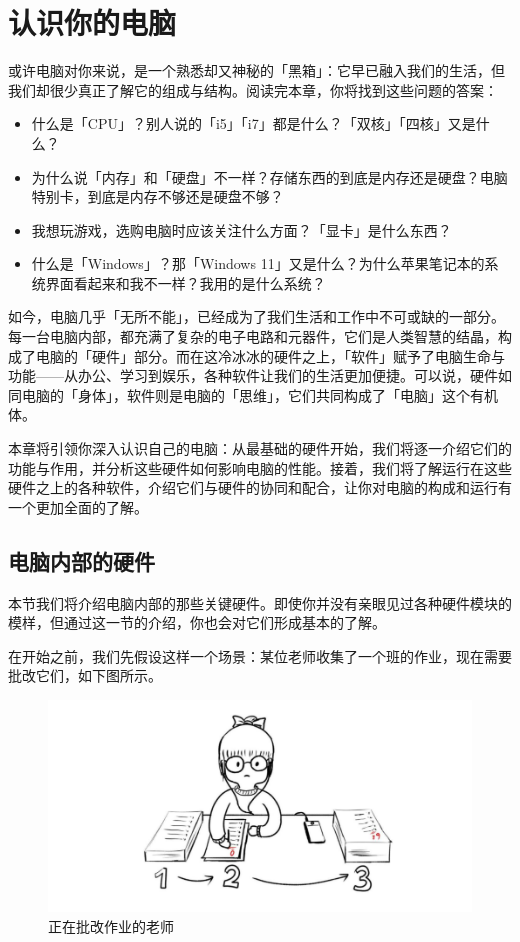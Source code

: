 \chapter{认识你的电脑}
\label{cha:computer-and-its-components}

\begin{intro}
  或许电脑对你来说，是一个熟悉却又神秘的「黑箱」：它早已融入我们的生活，但我们却很少真正了解它的组成与结构。阅读完本章，你将找到这些问题的答案：

  \begin{itemize}
    \item 什么是「CPU」？别人说的「i5」「i7」都是什么？「双核」「四核」又是什么？
    \item 为什么说「内存」和「硬盘」不一样？存储东西的到底是内存还是硬盘？电脑特别卡，到底是内存不够还是硬盘不够？
    \item 我想玩游戏，选购电脑时应该关注什么方面？「显卡」是什么东西？
    \item 什么是「Windows」？那「Windows 11」又是什么？为什么苹果笔记本的系统界面看起来和我不一样？我用的是什么系统？
  \end{itemize}
\end{intro}

如今，电脑几乎「无所不能」，已经成为了我们生活和工作中不可或缺的一部分。每一台电脑内部，都充满了复杂的电子电路和元器件，它们是人类智慧的结晶，构成了电脑的「硬件」部分。而在这冷冰冰的硬件之上，「软件」赋予了电脑生命与功能——从办公、学习到娱乐，各种软件让我们的生活更加便捷。可以说，硬件如同电脑的「身体」，软件则是电脑的「思维」，它们共同构成了「电脑」这个有机体。

本章将引领你深入认识自己的电脑：从最基础的硬件开始，我们将逐一介绍它们的功能与作用，并分析这些硬件如何影响电脑的性能。接着，我们将了解运行在这些硬件之上的各种软件，介绍它们与硬件的协同和配合，让你对电脑的构成和运行有一个更加全面的了解。

\section{电脑内部的硬件} 

本节我们将介绍电脑内部的那些关键硬件。即使你并没有亲眼见过各种硬件模块的模样，但通过这一节的介绍，你也会对它们形成基本的了解。

在开始之前，我们先假设这样一个场景：某位老师收集了一个班的作业，现在需要批改它们，如下图所示。

\begin{figure}[htb!]
  \centering
  \includegraphics[width=.5\textwidth]{assets/basic/Teacher_and_homework.png}
  \caption{正在批改作业的老师}
  \label{fig:teacher-and-homework}
\end{figure}

